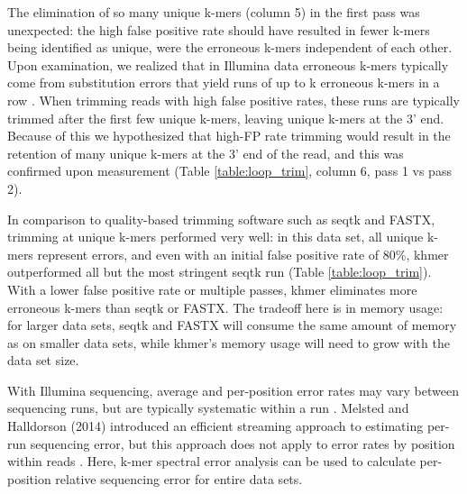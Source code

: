 The elimination of so many unique k-mers (column 5) in the first pass was
unexpected: the high false positive rate should have resulted in fewer k-mers
being identified as unique, were the erroneous k-mers independent of each
other. Upon examination, we realized that in Illumina data erroneous k-mers
typically come from substitution errors that yield runs of up to k erroneous
k-mers in a row \cite{Kelley2010}.  When trimming reads with high false
positive rates, these runs are typically trimmed after the first few unique
k-mers, leaving unique k-mers at the 3' end.  Because of this we hypothesized
that high-FP rate trimming would result in the retention of many unique k-mers
at the 3' end of the read, and this was confirmed upon measurement (Table
\ref{table:loop_trim}, column 6, pass 1 vs pass 2).

In comparison to quality-based trimming software such as seqtk and FASTX,
trimming at unique k-mers performed very well: in this data set, all unique
k-mers represent errors, and even with an initial false positive rate of 80\%,
khmer outperformed all but the most stringent seqtk run (Table
\ref{table:loop_trim}).  With a lower false positive rate or multiple passes,
khmer eliminates more erroneous k-mers than seqtk or FASTX.  The tradeoff here
is in memory usage: for larger data sets, seqtk and FASTX will consume the same
amount of memory as on smaller data sets, while khmer's memory usage will need
to grow with the data set size.


With Illumina sequencing, average and per-position error rates may
vary between sequencing runs, but are typically systematic within a
run \cite{drisee}.  Melsted and Halldorson (2014) introduced an
efficient streaming approach to estimating per-run sequencing error,
but this approach does not apply to error rates by position within
reads \cite{Melsted2014}.  Here, k-mer spectral error analysis can be
used to calculate per-position relative sequencing error for entire
data sets. 


